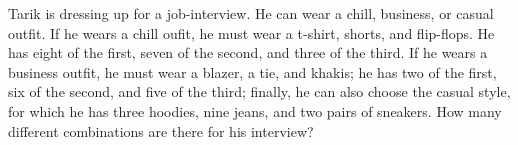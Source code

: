 Tarik is dressing up for a job-interview. He can wear a chill, business, or casual outfit. If he wears a chill oufit, he must wear a t-shirt, shorts, and flip-flops. He has eight of the first, seven of the second, and three of the third. If he wears a business outfit, he must wear a blazer, a tie, and khakis; he has two of the first, six of the second, and five of the third; finally, he can also choose the casual style, for which he has three hoodies, nine jeans, and two pairs of sneakers. How many different combinations are there for his interview?
